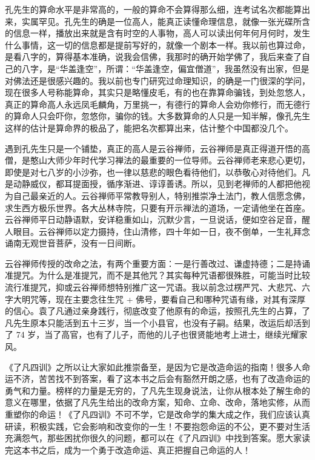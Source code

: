 孔先生的算命水平是非常高的，一般的算命不会算得那么细，连考试名次都能算出来，实属罕见。孔先生的确是一位高人，能真正读懂命理信息，就像一张光碟所含的信息一样，播放出来就是含有时空的人事物，高人可以读出何年何月何时，发生什么事情，这一切的信息都是提前写好的，就像一个剧本一样。我以前也算过命，是看八字的，算得基本准确，说我会信佛，我那时的确开始学佛了，我后来查了自己的八字，是“华盖逢空”，所谓：“华盖逢空，偏宜僧道”，我虽然没有出家，但是对佛法还是很感兴趣的。我以前也专门研究过命理知识，的确是一门很深的学问，现在很多人号称能算命，其实只是略懂皮毛，有的也在靠算命骗钱，到处忽悠人，真正的算命高人永远凤毛麟角，万里挑一，有德行的算命人会劝你修行，而无德行的算命人只会吓你，忽悠你，骗你的钱。大多数算命的人只是一知半解，像孔先生这样的估计是算命界的极品了，能把名次都算出来，估计整个中国都没几个。

遇到孔先生只是一个铺垫，真正的高人是云谷禅师，云谷禅师是真正得道开悟的高僧，是憨山大师少年时代学习禅法的最重要的一位导师。云谷禅师老来悲心更切，即使是对七八岁的小沙弥，也一律以慈悲的眼色看待他们，以恭敬心对待他们。凡是动静威仪，都耳提面授，循序渐进、谆谆善诱。所以，见到老禅师的人都把他视为自己最亲近的人。云谷禅师平常教导别人，特别推崇净土法门，教人信愿念佛，求生西方极乐世界。各大丛林寺院，只要有开示禅法的道场，一定请他坐在首座。云谷禅师平日动静语默，安详稳重如山，沉默少言，一旦说话，便如空谷足音，醒人眼目。云谷禅师以定力摄持，住山清修，四十年如一日，夜不倒单，一生礼拜念诵南无观世音菩萨，没有一日间断。

云谷禅师传授的改命之法，有两个重要方面：一是行善改过、谦虚持德；二是持诵准提咒。为什么是准提咒，而不是其他咒？其实每种咒语都很殊胜，可能当时比较流行准提咒，抑或云谷禅师想特别推广这一咒语。我以前念过楞严咒、大悲咒、六字大明咒等，现在主要念往生咒 + 佛号，要看自己和哪种咒语有缘，对其有深厚的信心。袁了凡通过亲身践行，彻底改变了他原有的命运，按照孔先生的占算，了凡先生原本只能活到五十三岁，当一个小县官，也没有子嗣。结果，改运后却活到了 74 岁，当了高官，也有了儿子，而他的儿子也很贤能地考上进士，继续光耀家风。

《了凡四训》之所以让大家如此推崇备至，是因为它是改造命运的指南！很多人命运不济，苦苦找不到答案，看了这本书之后会有豁然开朗之感，也有了改造命运的勇气和力量。榜样的力量是无穷的，了凡先生现身说法，让你从根本处了解生命的意义在哪里，依据了凡先生给出的改命方案，知命、立命、改命，落地实修，从而重塑你的命运！《了凡四训》不可不学，它是改命学的集大成之作，我们应该认真研读，积极实践，它会影响和改变你的一生！不要抱怨命运的不公，更不要对生活充满怨气，那些困扰你很久的问题，都可以在《了凡四训》中找到答案。愿大家读完这本书之后，成为一个勇于改造命运、真正把握自己命运的人！

